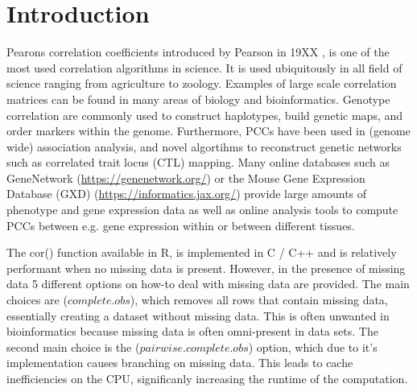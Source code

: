 \documentclass{bioinfo}
\begin{document}
\maketitle

\section{Introduction}
Pearons correlation coefficients introduced by Pearson in 19XX 
\citep{Bag01}, is one of the most used correlation algorithms 
in science. It is used ubiquitously in all field of science 
ranging from agriculture to zoology. Examples of large scale 
correlation matrices can be found in many areas of biology and 
bioinformatics. Genotype correlation are commonly used to 
construct haplotypes, build genetic maps, and order markers 
within the genome. Furthermore, PCCs have been used in (genome 
wide) association analysis, and novel algortihms to reconstruct 
genetic networks such as correlated trait locus (CTL) mapping. 
Many online databases such as 
GeneNetwork (\href{https://genenetwork.org/}{https://genenetwork.org/}) 
or the 
Mouse Gene Expression Database (GXD) (\href{https://informatics.jax.org/}{https://informatics.jax.org/})
provide large amounts of phenotype and gene expression data as 
well as online analysis tools to compute PCCs between e.g. 
gene expression within or between different tissues.\par

The cor() function available in R, is implemented in C / C++ and 
is relatively performant when no missing data is present. However, 
in the presence of missing data 5 different options on how-to deal 
with missing data are provided. The main choices are ($complete.obs$), 
which removes all rows that contain missing data, essentially 
creating a dataset without missing data. This is often unwanted in 
bioinformatics because missing data is often omni-present in data 
sets. The second main choice is the ($pairwise.complete.obs$) option, 
which due to it's implementation causes branching on missing data. This
leads to cache inefficiencies on the CPU, significanly increasing the 
runtime of the computation.
\end{document}
